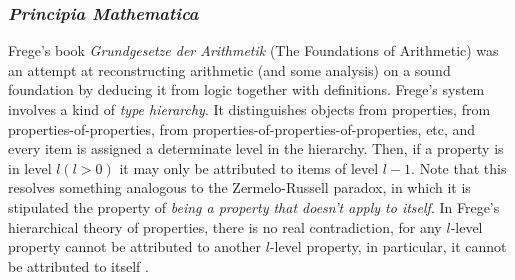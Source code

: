 \documentclass[12p]{article}
\theoremstyle{definition}
\begin{document}
\subsubsection{\textit{Principia Mathematica}}
Frege's book \textit{Grundgesetze der Arithmetik} (The Foundations of Arithmetic) was an attempt at reconstructing arithmetic (and some analysis) on a sound foundation by deducing it from logic together with definitions.
Frege's system involves a kind of \textit{type hierarchy}. It distinguishes objects from properties, from properties-of-properties, from properties-of-properties-of-properties, etc, and every item is assigned a determinate level in the hierarchy. Then, if a property is in level $l (l > 0)$ it may only be attributed to items of level $l-1$. Note that this resolves something analogous to the Zermelo-Russell paradox, in which it is stipulated the property of \textit{being a property that doesn't apply to itself}. In Frege's hierarchical theory of properties, there is no real contradiction, for any $l$-level property cannot be attributed to another $l$-level property, in particular, it cannot be attributed to itself \cite{smith2013introduction}.
\end{document}

